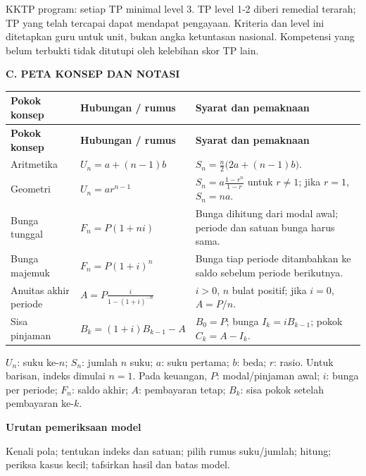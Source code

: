 \documentclass[11pt,a4paper]{article}
\begin{document}
{\small KKTP program: setiap TP minimal level 3. TP level 1-2 diberi remedial terarah; TP yang telah tercapai dapat mendapat pengayaan. Kriteria dan level ini ditetapkan guru untuk unit, bukan angka ketuntasan nasional. Kompetensi yang belum terbukti tidak ditutupi oleh kelebihan skor TP lain.\par}\medskip
\clearpage
\begin{center}\bfseries\large C. PETA KONSEP DAN NOTASI\end{center}\medskip
{\small\setlength{\tabcolsep}{2mm}\renewcommand{\arraystretch}{1.35}\begin{longtable}{|>{\raggedright\arraybackslash}p{29.188mm}|>{\raggedright\arraybackslash}p{58.376mm}|>{\raggedright\arraybackslash}p{77.835mm}|}\hline
\rowcolor{gray!10}\textbf{Pokok konsep} & \textbf{Hubungan / rumus} & \textbf{Syarat dan pemaknaan}\\ \hline
\endfirsthead
\rowcolor{gray!10}\textbf{Pokok konsep} & \textbf{Hubungan / rumus} & \textbf{Syarat dan pemaknaan}\\ \hline
\endhead
Aritmetika & \(U_n=a+(n-1)b\) & \(S_n=\frac n2\bigl(2a+(n-1)b\bigr)\).\\ \hline
Geometri & \(U_n=ar^{n-1}\) & \(S_n=a\frac{1-r^n}{1-r}\) untuk \(r\ne1\); jika \(r=1\), \(S_n=na\).\\ \hline
Bunga tunggal & \(F_n=P(1+ni)\) & Bunga dihitung dari modal awal; periode dan satuan bunga harus sama.\\ \hline
Bunga majemuk & \(F_n=P(1+i)^n\) & Bunga tiap periode ditambahkan ke saldo sebelum periode berikutnya.\\ \hline
Anuitas akhir periode & \(A=P\frac{i}{1-(1+i)^{-n}}\) & \(i>0\), \(n\) bulat positif; jika \(i=0\), \(A=P/n\).\\ \hline
Sisa pinjaman & \(B_k=(1+i)B_{k-1}-A\) & \(B_0=P\); bunga \(I_k=iB_{k-1}\); pokok \(C_k=A-I_k\).\\ \hline
\end{longtable}}\medskip
{\small \(U_n\): suku ke-\(n\); \(S_n\): jumlah \(n\) suku; \(a\): suku pertama; \(b\): beda; \(r\): rasio. Untuk barisan, indeks dimulai \(n=1\). Pada keuangan, \(P\): modal/pinjaman awal; \(i\): bunga per periode; \(F_n\): saldo akhir; \(A\): pembayaran tetap; \(B_k\): sisa pokok setelah pembayaran ke-\(k\).\par}\medskip
\par\medskip\noindent\textbf{Urutan pemeriksaan model}\par\smallskip
Kenali pola; tentukan indeks dan satuan; pilih rumus suku/jumlah; hitung; periksa kasus kecil; tafsirkan hasil dan batas model.\par\medskip
\end{document}

